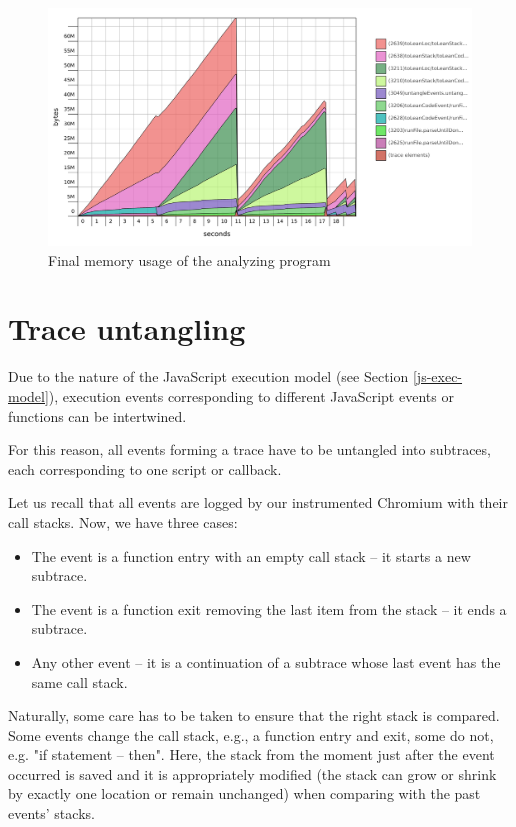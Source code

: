 \begin{figure}[hbt!]
 \centering
 \includegraphics[width=\textwidth]{png/strings-map}
 \caption{Final memory usage of the analyzing program}
 \label{fig:strings-map}
\end{figure}


\section{Trace untangling}
Due to the nature of the JavaScript execution model (see Section \ref{js-exec-model}), execution events
corresponding to different JavaScript events or functions can be intertwined.

For this reason, all events forming a trace have to be untangled into subtraces, each corresponding
to one script or callback. 

Let us recall that all events are logged by our instrumented Chromium with their call stacks.
Now, we have three cases:
\begin{itemize}
  \item The event is a function entry with an empty call stack -- it starts a new subtrace.
  \item The event is a function exit removing the last item from the stack -- it ends a subtrace.
  \item Any other event -- it is a continuation of a subtrace whose last event has the same call stack.
\end{itemize}

Naturally, some care has to be taken to ensure that the right stack is compared. Some events change the
call stack, e.g., a function entry and exit, some do not, e.g. "if statement -- then".
Here, the stack from the moment just after the event occurred is saved and it is appropriately modified 
(the stack can grow or shrink by exactly one location or remain unchanged) when comparing
with the past events' stacks.

